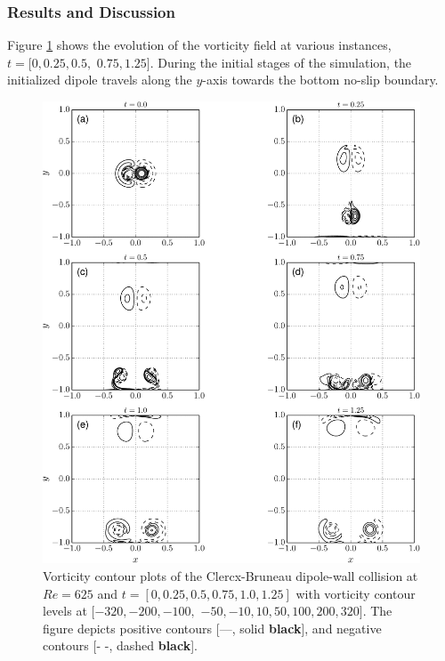 \subsubsection*{Results and Discussion}

Figure \ref{fig:dipole_contourLine_portrait} shows the evolution of the vorticity field at various instances, $t = [0, 0.25, 0.5,$ $0.75, 1.25]$. During the initial stages of the simulation, the initialized dipole travels along the $y$-axis towards the bottom no-slip boundary. 

	\begin{figure}[!p]
	\centering
	\includegraphics[width=\linewidth]{./figures/eulerian/dipole_contourLine_portrait-crop.pdf}
	\caption{Vorticity contour plots of the Clercx-Bruneau dipole-wall collision at $Re=625$ and $t = [0, 0.25, 0.5, 0.75, 1.0, 1.25]$ with vorticity contour levels at $[-320,-200,-100,$ $-50,-10,10, 50, 100, 200, 320]$. The figure depicts positive contours [---, solid \textbf{black}], and negative contours [- -, dashed \textbf{black}].}
	\label{fig:dipole_contourLine_portrait}
	\end{figure}

